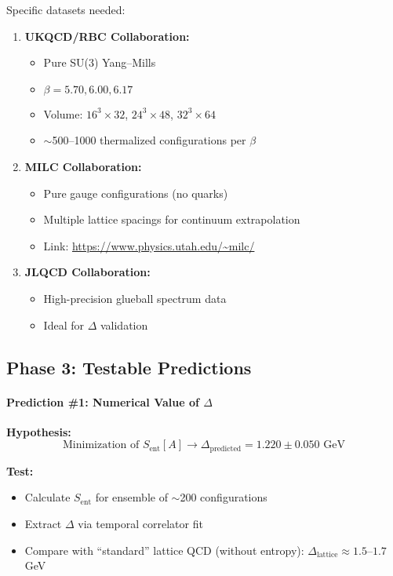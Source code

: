 \documentclass[11pt]{article}
\theoremstyle{definition}
\theoremstyle{remark}
\begin{document}
Specific datasets needed:
\begin{enumerate}
\item \textbf{UKQCD/RBC Collaboration:}
  \begin{itemize}
  \item Pure SU(3) Yang--Mills
  \item $\beta = 5.70, 6.00, 6.17$
  \item Volume: $16^3 \times 32$, $24^3 \times 48$, $32^3 \times 64$
  \item $\sim$500--1000 thermalized configurations per $\beta$
  \end{itemize}

\item \textbf{MILC Collaboration:}
  \begin{itemize}
  \item Pure gauge configurations (no quarks)
  \item Multiple lattice spacings for continuum extrapolation
  \item Link: \url{https://www.physics.utah.edu/~milc/}
  \end{itemize}

\item \textbf{JLQCD Collaboration:}
  \begin{itemize}
  \item High-precision glueball spectrum data
  \item Ideal for $\Delta$ validation
  \end{itemize}
\end{enumerate}

\subsection{Phase 3: Testable Predictions}

\paragraph{Prediction \#1: Numerical Value of $\Delta$}

\textbf{Hypothesis:}
\[
\text{Minimization of } S_{\text{ent}}[A] \to \Delta_{\text{predicted}} = 1.220 \pm 0.050 \text{ GeV}
\]

\textbf{Test:}
\begin{itemize}
\item Calculate $S_{\text{ent}}$ for ensemble of $\sim$200 configurations
\item Extract $\Delta$ via temporal correlator fit
\item Compare with ``standard'' lattice QCD (without entropy): $\Delta_{\text{lattice}} \approx 1.5$--$1.7$ GeV
\end{itemize}
\end{document}
